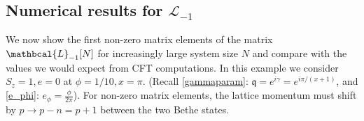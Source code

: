 \documentclass[a4paper,10pt]{article}
\newcommand{\q}{\mathfrak{q}}
\newcommand{\jesper}[1]{$\framebox{\tiny J}$\ \textbf{\texttt{{\color{cyan}\footnotesize#1}}}}
\newcommand{\KSgen}{\mathcal{L}}
\newcommand{\LnMat}[1]{\mathbcal{L}_{#1}}
\begin{document}
\subsection{Numerical results for $\KSgen_{-1}$}
\label{sec:KS_Lminus1}


%


We now show the first non-zero matrix elements of the matrix $\LnMat{-1}[N]$ for increasingly large system size $N$ and compare with the values we would expect from CFT computations. In this example we consider $S_z=1,e=0$ at $\phi=1/10, x=\pi$. (Recall \eqref{gammaparam}: $\q =e^{i\gamma} = e^{i\pi/(x+1)}$, and \eqref{e_phi}: $e_{\phi} = \frac{\phi}{2\pi}$). For non-zero matrix elements, the lattice momentum must shift by $p \rightarrow p -n = p +1$ between the two Bethe states. 
\end{document}
